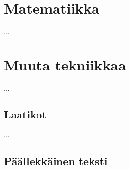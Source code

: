 \documentclass{book}
\begin{document}
\cleardoublepage
\pagestyle{plain}

\tableofcontents

\cleardoublepage







\chapter{Matematiikka}
\label{luku:matematiikka}


...

\chapter{Muuta tekniikkaa}

...

\section{Laatikot}
\label{luku:laatikot}

...

\section{Päällekkäinen teksti}
\end{document}
